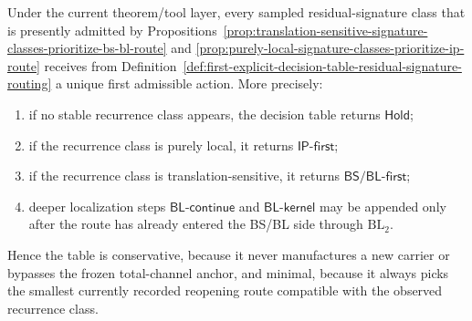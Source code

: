 \begin{proposition}
\label{prop:first-explicit-decision-table-conservative-and-minimal}
Under the current theorem/tool layer, every sampled residual-signature class that is presently admitted by Propositions~\ref{prop:translation-sensitive-signature-classes-prioritize-bs-bl-route} and \ref{prop:purely-local-signature-classes-prioritize-ip-route} receives from Definition~\ref{def:first-explicit-decision-table-residual-signature-routing} a unique first admissible action. More precisely:
\begin{enumerate}[label=(\roman*)]
 \item if no stable recurrence class appears, the decision table returns \(\mathsf{Hold}\);
 \item if the recurrence class is purely local, it returns \(\mathsf{IP\text{-}first}\);
 \item if the recurrence class is translation-sensitive, it returns \(\mathsf{BS/BL\text{-}first}\);
 \item deeper localization steps \(\mathsf{BL\text{-}continue}\) and \(\mathsf{BL\text{-}kernel}\) may be appended only after the route has already entered the BS/BL side through \(\mathrm{BL}_2\).
\end{enumerate}
Hence the table is conservative, because it never manufactures a new carrier or bypasses the frozen total-channel anchor, and minimal, because it always picks the smallest currently recorded reopening route compatible with the observed recurrence class.
\end{proposition}

